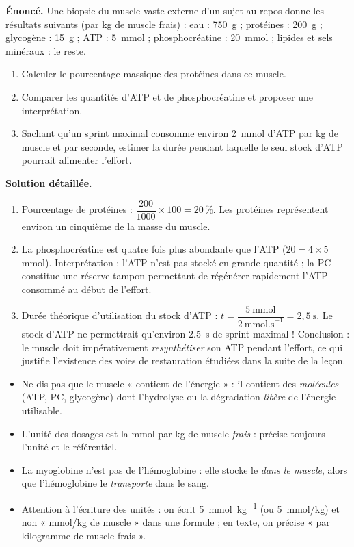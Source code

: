 \documentclass[11pt]{article}
\begin{document}
\begin{exoresolu}
\textbf{Énoncé.} Une biopsie du muscle vaste externe d'un sujet au repos donne les résultats suivants (par kg de muscle frais) : eau : \SI{750}{g} ; protéines : \SI{200}{g} ; glycogène : \SI{15}{g} ; ATP : \SI{5}{mmol} ; phosphocréatine : \SI{20}{mmol} ; lipides et sels minéraux : le reste.
\begin{enumerate}
\item Calculer le pourcentage massique des protéines dans ce muscle.
\item Comparer les quantités d'ATP et de phosphocréatine et proposer une interprétation.
\item Sachant qu'un sprint maximal consomme environ \SI{2}{mmol} d'ATP par kg de muscle et par seconde, estimer la durée pendant laquelle le seul stock d'ATP pourrait alimenter l'effort.
\end{enumerate}
\tcblower
\textbf{Solution détaillée.}
\begin{enumerate}
\item Pourcentage de protéines : $\dfrac{200}{1000} \times 100 = 20\,\%$. Les protéines représentent environ un cinquième de la masse du muscle.
\item La phosphocréatine est quatre fois plus abondante que l'ATP ($20 = 4 \times 5$ mmol). Interprétation : l'ATP n'est pas stocké en grande quantité ; la PC constitue une réserve tampon permettant de régénérer rapidement l'ATP consommé au début de l'effort.
\item Durée théorique d'utilisation du stock d'ATP : $t = \dfrac{5\ \text{mmol}}{2\ \text{mmol.s}^{-1}} = 2,5\ \text{s}$. Le stock d'ATP ne permettrait qu'environ \SI{2.5}{s} de sprint maximal ! Conclusion : le muscle doit impérativement \emph{resynthétiser} son ATP pendant l'effort, ce qui justifie l'existence des voies de restauration étudiées dans la suite de la leçon.
\end{enumerate}
\end{exoresolu}

\begin{attention}
\begin{itemize}
\item Ne dis pas que le muscle « contient de l'énergie » : il contient des \emph{molécules} (ATP, PC, glycogène) dont l'hydrolyse ou la dégradation \emph{libère} de l'énergie utilisable.
\item L'unité des dosages est la mmol par kg de muscle \emph{frais} : précise toujours l'unité et le référentiel.
\item La myoglobine n'est pas de l'hémoglobine : elle stocke le  \emph{dans le muscle}, alors que l'hémoglobine le \emph{transporte} dans le sang.
\item Attention à l'écriture des unités : on écrit \SI{5}{mmol.kg^{-1}} (ou \SI{5}{mmol/kg}) et non « mmol/kg de muscle » dans une formule ; en texte, on précise « par kilogramme de muscle frais ».
\end{itemize}
\end{attention}
\end{document}
